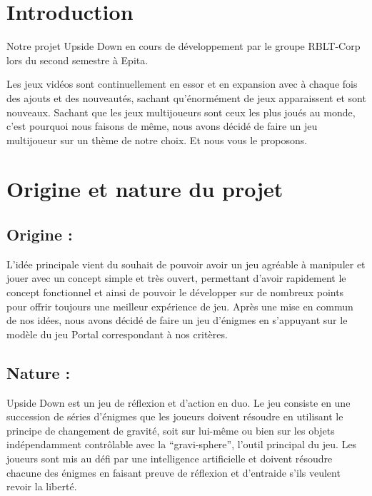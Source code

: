 \documentclass[a4paper,11pt]{article}
\begin{document}
  



\newpage

\tableofcontents

\newpage


\section{Introduction}

Notre projet Upside Down en cours de développement par le groupe RBLT-Corp lors 
du second semestre à Epita.\newline

Les jeux vidéos sont continuellement en essor et en expansion avec à chaque fois des 
ajouts et des nouveautés, sachant qu’énormément de jeux apparaissent et sont nouveaux. 
Sachant que les jeux multijoueurs sont ceux les plus joués au monde, c’est pourquoi 
nous faisons de même, nous avons décidé de faire un jeu multijoueur sur un thème de notre choix. Et nous vous le proposons.



\section{Origine et nature du projet}

\subsection{Origine :}

	L’idée principale vient du souhait de pouvoir avoir un jeu agréable à manipuler 
    et jouer avec un concept simple et très ouvert, permettant d’avoir rapidement le concept fonctionnel et ainsi de pouvoir le développer sur de nombreux points pour offrir toujours une meilleur expérience de jeu. Après une mise en commun de nos idées, nous avons décidé de faire un jeu d’énigmes en s’appuyant sur le modèle du jeu Portal correspondant à nos critères.	

    \subsection{Nature :}
	Upside Down est un jeu de réflexion et d'action en duo.
Le jeu consiste en une succession de séries d'énigmes que les joueurs doivent 
résoudre en utilisant le principe de changement de gravité, soit sur lui-même ou bien sur les objets indépendamment contrôlable avec la “gravi-sphere”, l’outil principal du jeu. Les joueurs sont mis au défi par une intelligence artificielle et doivent résoudre chacune des énigmes en faisant preuve de réflexion et d'entraide s'ils veulent revoir la liberté.
\end{document}

